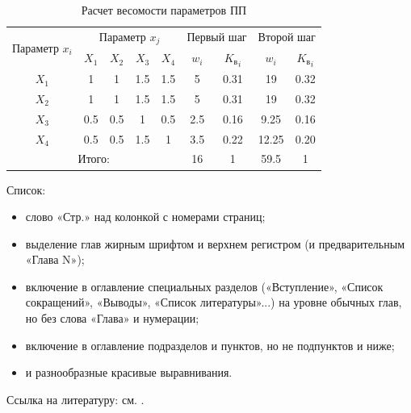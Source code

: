 \begin{table}[ht]
    \caption{Расчет весомости параметров ПП}
    \label{tab_weight}
    \centering
        \begin{tabular}{|c|c|c|c|c|c|c|c|c|}
        \hline \multirow{2}{*}{Параметр $x_i$} & \multicolumn{4}{c|}{Параметр $x_j$} & 
            \multicolumn{2}{c|}{Первый шаг} & \multicolumn{2}{c|}{Второй шаг} \\
        \cline{2-9} & $X_1$ & $X_2$ & $X_3$ & $X_4$ & $w_i$ & 
            ${K_\text{в}}_i$ & $w_i$ & ${K_\text{в}}_i$ \\
        \hline $X_1$ & 1 & 1 & 1.5 & 1.5 & 5 & 0.31 & 19 & 0.32 \\
        \hline $X_2$ & 1 & 1 & 1.5 & 1.5 & 5 & 0.31 & 19 & 0.32 \\
        \hline $X_3$ & 0.5 & 0.5 & 1 & 0.5 & 2.5 & 0.16 & 9.25 & 0.16 \\
        \hline $X_4$ & 0.5 & 0.5 & 1.5 & 1 & 3.5 & 0.22 & 12.25 & 0.20 \\
        \hline \multicolumn{5}{|c|}{Итого:} & 16 & 1 & 59.5 & 1 \\
        \hline
        \end{tabular}
\end{table}

Список:
\begin{itemize}
\item слово «Стр.» над колонкой с номерами страниц;
\item выделение глав жирным шрифтом и верхнем регистром (и предварительным «Глава N»);
\item включение в оглавление специальных разделов («Вступление», «Список сокращений», «Выводы», «Список литературы»...) на уровне обычных глав, но без слова «Глава» и нумерации;
\item включение в оглавление подразделов и пунктов, но не подпунктов и ниже;
\item и разнообразные красивые выравнивания.
\end{itemize}

Ссылка на литературу: см. \cite{Кнорринг1976}.
